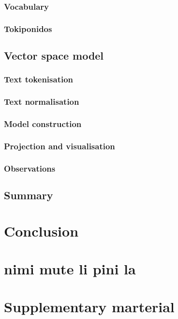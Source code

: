 \documentclass[14pt, a4paper]{extreport}
\begin{document}
    \subsection{Vocabulary}
    \subsection{Tokiponidos}
  \section{Vector space model}
    \subsection{Text tokenisation}
    \subsection{Text normalisation}
    \subsection{Model construction}
    \subsection{Projection and visualisation}
    \subsection{Observations}
  \section{Summary}



\chapter{Conclusion}

\chapter{nimi mute li pini la}



\printbibliography[heading=bibintoc, title={References}, nottype=online]
\printbibliography[heading=bibintoc, title={Online resources}, type=online]



\chapter{Supplementary marterial}
\end{document}

